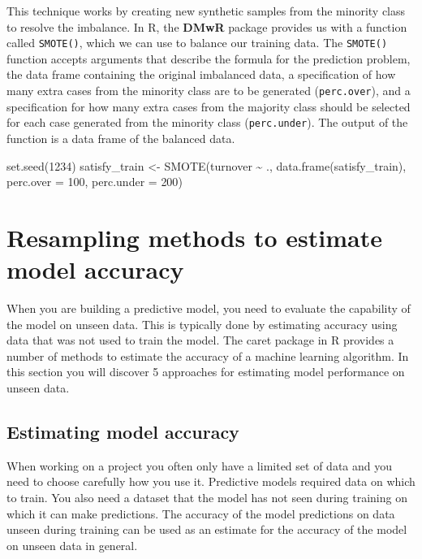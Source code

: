 \documentclass[
]{book}
\newenvironment{Shaded}{\begin{snugshade}}{\end{snugshade}}
\newcommand{\AttributeTok}[1]{\textcolor[rgb]{0.77,0.63,0.00}{#1}}
\newcommand{\DecValTok}[1]{\textcolor[rgb]{0.00,0.00,0.81}{#1}}
\newcommand{\FunctionTok}[1]{\textcolor[rgb]{0.00,0.00,0.00}{#1}}
\newcommand{\NormalTok}[1]{#1}
\newcommand{\OtherTok}[1]{\textcolor[rgb]{0.56,0.35,0.01}{#1}}
\newcommand{\SpecialCharTok}[1]{\textcolor[rgb]{0.00,0.00,0.00}{#1}}
\begin{document}
This technique works by creating new synthetic samples from the minority class to resolve the imbalance. In R, the \textbf{DMwR} package provides us with a function called \texttt{SMOTE()}, which we can use to balance our training data. The \texttt{SMOTE()} function accepts arguments that describe the formula for the prediction problem, the data frame containing the original imbalanced data, a specification of how many extra cases from the minority class are to be generated (\texttt{perc.over}), and a specification for how many extra cases from the majority class should be selected for each case generated from the minority class (\texttt{perc.under}). The output of the function is a data frame of the balanced data.

\begin{Shaded}
\begin{Highlighting}[]
\FunctionTok{set.seed}\NormalTok{(}\DecValTok{1234}\NormalTok{)}
\NormalTok{satisfy\_train }\OtherTok{\textless{}{-}} \FunctionTok{SMOTE}\NormalTok{(turnover }\SpecialCharTok{\textasciitilde{}}\NormalTok{ ., }\FunctionTok{data.frame}\NormalTok{(satisfy\_train),}
                      \AttributeTok{perc.over =} \DecValTok{100}\NormalTok{, }\AttributeTok{perc.under =} \DecValTok{200}\NormalTok{)}
\end{Highlighting}
\end{Shaded}

\hypertarget{resampling-methods-to-estimate-model-accuracy-1}{%
\section{Resampling methods to estimate model accuracy}\label{resampling-methods-to-estimate-model-accuracy-1}}

When you are building a predictive model, you need to evaluate the capability of the model on unseen data. This is typically done by estimating accuracy using data that was not used to train the model. The caret package in R provides a number of methods to estimate the accuracy of a machine learning algorithm. In this section you will discover 5 approaches for estimating model performance on unseen data.

\hypertarget{estimating-model-accuracy-1}{%
\subsection{Estimating model accuracy}\label{estimating-model-accuracy-1}}

When working on a project you often only have a limited set of data and you need to choose carefully how you use it. Predictive models required data on which to train. You also need a dataset that the model has not seen during training on which it can make predictions. The accuracy of the model predictions on data unseen during training can be used as an estimate for the accuracy of the model on unseen data in general.
\end{document}
